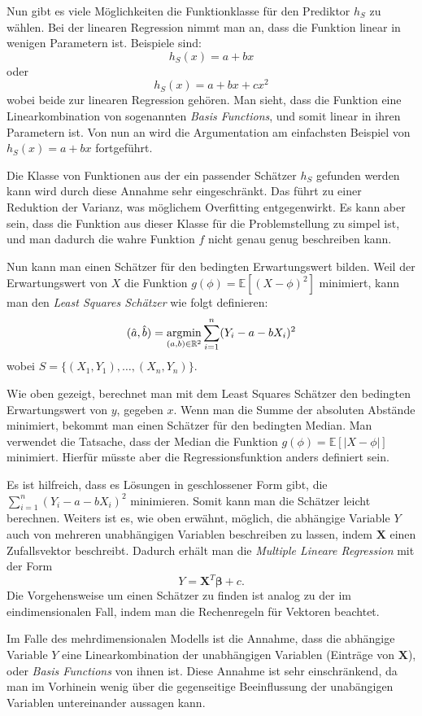 Nun gibt es viele M\"oglichkeiten die Funktionklasse f\"ur den Prediktor $h_S$ zu w\"ahlen. Bei der linearen
Regression nimmt man an, dass die Funktion linear in wenigen Parametern ist. Beispiele sind:
$$ h_S(x) = a + bx $$
oder
$$ h_S(x) = a + bx + cx^2$$
wobei beide zur linearen Regression geh\"oren. Man sieht, dass die Funktion eine Linearkombination von sogenannten \textit{Basis Functions}, und somit
linear in ihren Parametern ist. Von nun an wird die Argumentation am einfachsten Beispiel von $ h_S(x) = a + bx $ fortgef\"uhrt.

Die Klasse von Funktionen aus der ein passender Sch\"atzer $h_S$ gefunden werden kann wird durch diese Annahme sehr eingeschr\"ankt. Das f\"uhrt zu einer
Reduktion der Varianz, was m\"oglichem Overfitting entgegenwirkt. Es kann aber sein, dass die Funktion aus dieser Klasse f\"ur die Problemstellung zu simpel ist, und
man dadurch die wahre Funktion $f$ nicht genau genug beschreiben kann.

Nun kann man einen Sch\"atzer f\"ur den bedingten Erwartungswert bilden.
Weil der Erwartungswert von $X$ die Funktion $g(\phi) = \mathbb{E}[(X - \phi)^2]$ minimiert, kann man den \textit{Least Squares Sch\"atzer} wie folgt definieren:
$$ (\hat{a}, \hat{b}) = \operatorname*{argmin}_{(a,b) \in \mathbb{R}^2} \sum_{i=1}^n (Y_i - a - bX_i)^2$$
wobei $S = \{(X_1, Y_1), \dots , (X_n,Y_n)\}$.

Wie oben gezeigt, berechnet man mit dem Least Squares Sch\"atzer den bedingten Erwartungswert von $y$, gegeben $x$.
Wenn man die Summe der absoluten Abst\"ande minimiert, bekommt man einen Sch\"atzer f\"ur den bedingten Median. Man verwendet die Tatsache, dass
der Median die Funktion $g(\phi) = \mathbb{E}[|X - \phi|]$ minimiert. Hierfür müsste aber die Regressionsfunktion anders definiert sein.

Es ist hilfreich, dass es L\"osungen in geschlossener Form gibt, die $\sum_{i=1}^n (Y_i - a - bX_i)^2 $ minimieren. Somit kann man die Sch\"atzer leicht berechnen.
Weiters ist es, wie oben erw\"ahnt, m\"oglich, die abh\"angige Variable $Y$ auch von mehreren unabh\"angigen Variablen beschreiben zu lassen, indem $\mathbf{X}$ einen Zufallsvektor beschreibt.
Dadurch erh\"alt man die \textit{Multiple Lineare Regression}
mit der Form
$$ Y = \mathbf{X}^T\mathbf{\beta} + c. $$
Die Vorgehensweise um einen Sch\"atzer zu finden ist analog zu der im eindimensionalen Fall, indem man die Rechenregeln f\"ur Vektoren beachtet.

Im Falle des mehrdimensionalen Modells ist die Annahme, dass die \glqq abh\"angige\grqq{} Variable $Y$ eine Linearkombination der \glqq unabh\"angigen\grqq{} Variablen
(Eintr\"age von $\mathbf{X}$), oder \textit{Basis Functions} von ihnen ist. Diese Annahme ist sehr einschr\"ankend, da man im Vorhinein wenig \"uber die gegenseitige Beeinflussung der
\glqq unab\"angigen\grqq{} Variablen untereinander aussagen kann.

